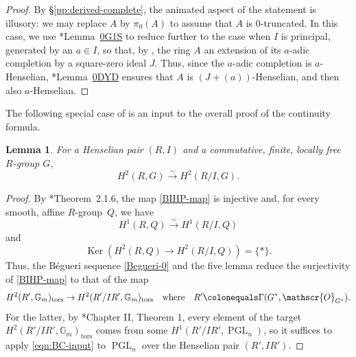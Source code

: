 \documentclass[11pt, reqno]{amsart}
\newcommand{\bG}{\mathbb{G}}
\newcommand{\bL}{\mathbb{L}}
\newcommand{\bZ}{\mathbb{Z}}
\newcommand{\sO}{\mathscr{O}}
\DeclareMathOperator{\Ker}{Ker}		%
\DeclareMathOperator{\PGL}{PGL}		%
\DeclareMathOperator{\Res}{Res}		%
\newcommand{\ce}{\colonequals}
\newcommand{\isomto}{\overset{\sim}{\longrightarrow}}
\newcommand{\ra}{\rightarrow}
\newcommand{\tors}{\mathrm{tors}}		%
\newcommand{\blem}{\begin{lemma}}
\newcommand{\elem}{\end{lemma}}
\newcommand{\lab}{\label}
\providecommand{\qxq}[1]{\quad\text{#1}\quad}
\newcommand{\tst}{\textstyle}
\newcommand{\be}{\begin{equation}}
\newcommand{\ee}{\end{equation}}
\newcommand{\bpf}{\begin{proof}}
\newcommand{\epf}{\end{proof}}
\numberwithin{equation}{numberingbase}
\theoremstyle{thms}
\newtheorem{lemma}[numberingbase]{Lemma}
\theoremstyle{claims}
\theoremstyle{defs}
\theoremstyle{thms}
\theoremstyle{defs}
\theoremstyle{subsection-tweak}
\theoremstyle{subsection-tweak}
\begin{document}
\bpf
By \S\ref{pp:derived-complete}, 
the animated aspect of the statement is illusory: we may replace $A$ by $\pi_0(A)$ to assume that $A$ is $0$-truncated. In this case, we use \cite{SP}*{Lemma~\href{https://stacks.math.columbia.edu/tag/0G1S}{0G1S}} to reduce further to the case when $I$ is principal, generated by an $a \in I$, so that, by , the ring $A$ an extension of its $a$-adic completion by a square-zero ideal $J$. 
Thus, since the $a$-adic completion %
is $a$-Henselian, \cite{SP}*{Lemma~\href{https://stacks.math.columbia.edu/tag/0DYD}{0DYD}} ensures that $A$ is $(J + (a))$-Henselian, and then also $a$-Henselian. %
\epf



The following special case of  is an input to the overall proof of the continuity formula.





\blem \lab{baby-inv-Hens-pair}
For a Henselian pair $(R, I)$ and a commutative, finite, locally free $R$-group $G$, 
\be \lab{BIHP-map}
H^2(R, G) \isomto H^2(R/I, G).
\ee
\elem

\bpf
By \cite{BC19}*{Theorem~2.1.6}, the map \eqref{BIHP-map} is injective and, for every smooth, affine $R$-group~$Q$, we have
\be \label{eqn:BC-input}
H^1(R, Q) \isomto H^1(R/I, Q) 
\ee
and
\[
\Ker(H^2(R, Q) \ra H^2(R/I, Q)) = \{*\}.
\]
Thus, the B\'{e}gueri sequence \eqref{Begueri-0} and the five lemma reduce the surjectivity of \eqref{BIHP-map} to that of the map 
\[
H^2(R', \bG_m)_\tors \ra H^2(R'/IR', \bG_m)_\tors \qxq{where} R' \ce \Gamma(G^*, \sO_{G^*}).
\]
For the latter, by \cite{Gab81}*{Chapter II, Theorem 1}, every element of the target $H^2(R'/IR', \bG_m)_\tors$ comes from some $H^1(R'/IR', \PGL_n)$, so it suffices to apply \eqref{eqn:BC-input} to $\PGL_{n}$ over the Henselian pair $(R', IR')$.
\epf
\end{document}
